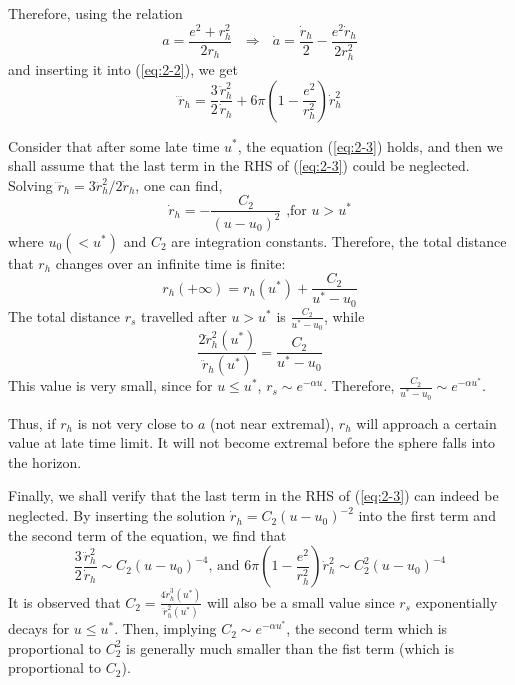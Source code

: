 \documentclass[letterpaper,12pt]{article}
\begin{document}
 Therefore, using the relation 
 \begin{equation}
 a = \frac{e^2+r_{h}^{2}}{2r_{h}}\textrm{ } \Rightarrow\textrm{ } \dot{a} = \frac{\dot{r}_{h}}{2}
 -\frac{e^{2}\dot{r}_{h}}{2r_{h}^2}
 \end{equation}
and inserting it into (\ref{eq:2-2}), we get
\begin{equation}\label{eq:2-3}
\dddot{r}_{h} = \frac{3}{2}\frac{\ddot{r}_{h}^{2}}{\dot{r}_{h}} + 6\pi\left(1-\frac{e^{2}}{r_{h}^{2}}\right)\dot{r}_{h}^{2}
\end{equation}

Consider that after some late time $u^{*}$, the equation (\ref{eq:2-3}) holds, and then we shall assume that the last term in the RHS of (\ref{eq:2-3}) could be neglected. Solving $\dddot{r}_{h} = 3\ddot{r}_{h}^{2}/2\dot{r}_{h}$, one can find,
\begin{equation}
  \dot{r}_{h} = -\frac{C_{2}}{(u-u_{0})^{2}} \textrm{ ,for } u> u^{*}
\end{equation}
where $u_{0} (< u^{*})$ and $C_{2}$ are integration constants. Therefore, the total distance that $r_{h}$ changes over an infinite time is finite:
\begin{equation}
  r_{h}(+\infty) = r_{h}(u^{*}) + \frac{C_{2}}{u^{*}-u_{0}}
\end{equation}
The total distance $r_{s}$ travelled after $u > u^{*}$ is $\frac{C_{2}}{u^{*}-u_{0}}$, while
\begin{equation}
\frac{2\dot{r}_{h}^{2}(u^{*})}{\ddot{r}_{h}(u^{*})} =\frac{C_{2}}{u^{*}-u_{0}}
\end{equation}
 This value is very small, since for $u \leq u^{*}$, $r_{s} \sim e^{-\alpha u} $. Therefore, $ \frac{C_{2}}{u^{*}-u_{0}} \sim e^{-\alpha u^{*}}$.

Thus, if $r_{h}$ is not very close to $a$ (not near extremal), $r_{h}$ will approach a certain value at late time limit. It will not become extremal before the sphere falls into the horizon.

Finally, we shall verify that the last term in the RHS of (\ref{eq:2-3}) can indeed be neglected. By inserting the solution $\dot{r}_{h} = C_{2}(u-u_{0})^{-2}$ into the first term and the second term of the equation, we find that
\begin{equation}
\frac{3}{2}\frac{\ddot{r}_{h}^{2}}{\dot{r}_{h}} \sim C_{2}(u-u_{0})^{-4} \textrm{, and }6\pi\left(1-\frac{e^{2}}{r_{h}^{2}}\right)\dot{r}_{h}^{2} \sim C_{2}^{2}(u-u_{0})^{-4}
\end{equation}
It is observed that $C_{2} = \frac{4\dot{r}_{h}^{3}(u^{*})}{\ddot{r}_{h}^{2}(u^{*})}$ will also be a small value since $r_{s}$ exponentially decays for $ u \leq u^{*}$.  Then, implying $ C_{2} \sim e^{-\alpha u^{*}}$, the second term which is proportional to $C_{2}^{2}$ is generally much smaller than the fist term (which is proportional to $C_{2}$).
\end{document}
